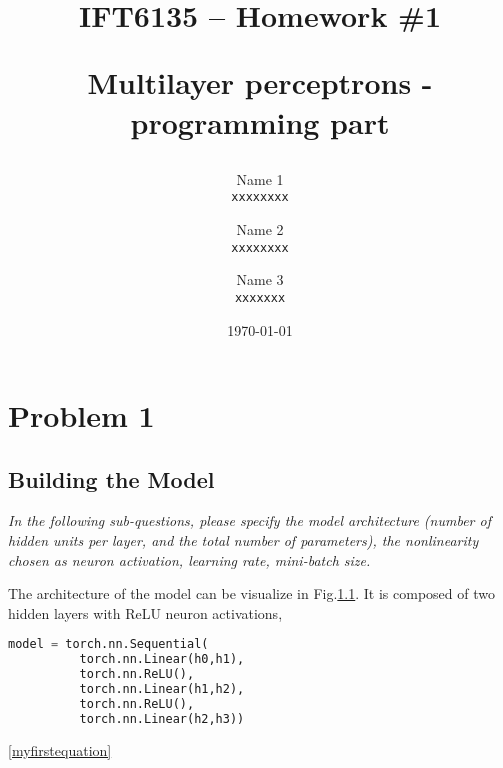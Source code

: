\documentclass[12pt]{article}
\title{
 IFT6135 -- Homework \#1 \\ 
\begin{large} 
  Multilayer perceptrons - programming part
\end{large} }
\author{
  Name 1 \\
  \texttt{xxxxxxxx}
  \and
  Name 2\\
  \texttt{xxxxxxxx}
  \and
  Name 3\\
  \texttt{xxxxxxx}
}
\date{\today}
\numberwithin{equation}{section}
\begin{document}
\maketitle



\section{Problem 1}

\subsection{Building the Model} %

\textit{In the following sub-questions, please specify the model architecture (number of hidden units per layer, and the total number of parameters), the nonlinearity chosen as neuron activation, learning rate, mini-batch size.}

The architecture of the model can be visualize in Fig.\ref{}.  It is composed of two hidden layers with ReLU neuron activations, 

\begin{lstlisting}[language=Python, label=xx]
model = torch.nn.Sequential(
          torch.nn.Linear(h0,h1),
          torch.nn.ReLU(),
          torch.nn.Linear(h1,h2),
          torch.nn.ReLU(),    
          torch.nn.Linear(h2,h3))
\end{lstlisting}





\ref{myfirstequation}
\end{document}
